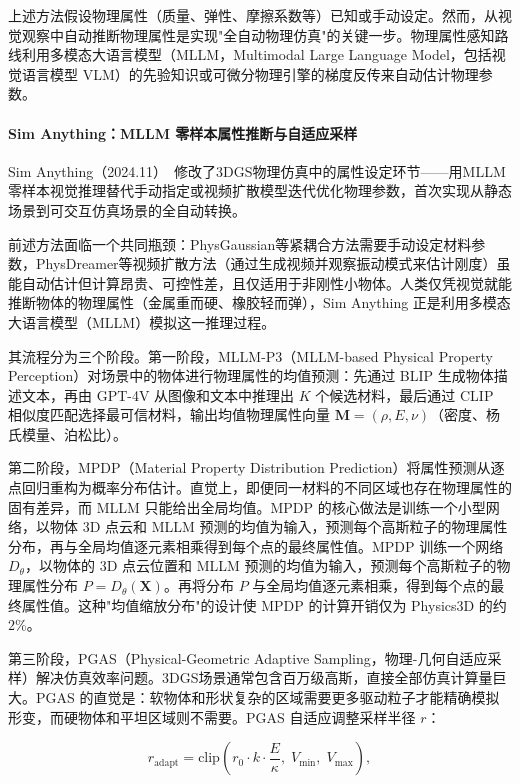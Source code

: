 上述方法假设物理属性（质量、弹性、摩擦系数等）已知或手动设定。然而，从视觉观察中自动推断物理属性是实现"全自动物理仿真"的关键一步。物理属性感知路线利用多模态大语言模型（MLLM，Multimodal Large Language Model，包括视觉语言模型 VLM）的先验知识或可微分物理引擎的梯度反传来自动估计物理参数。

\paragraph{Sim Anything：MLLM 零样本属性推断与自适应采样}

Sim Anything（2024.11）~\cite{2411_12789}修改了3DGS物理仿真中的属性设定环节——用MLLM零样本视觉推理替代手动指定或视频扩散模型迭代优化物理参数，首次实现从静态场景到可交互仿真场景的全自动转换。

前述方法面临一个共同瓶颈：PhysGaussian等紧耦合方法需要手动设定材料参数，PhysDreamer等视频扩散方法（通过生成视频并观察振动模式来估计刚度）虽能自动估计但计算昂贵、可控性差，且仅适用于非刚性小物体。人类仅凭视觉就能推断物体的物理属性（金属重而硬、橡胶轻而弹），Sim Anything 正是利用多模态大语言模型（MLLM）模拟这一推理过程。

其流程分为三个阶段。第一阶段，MLLM-P3（MLLM-based Physical Property Perception）对场景中的物体进行物理属性的均值预测：先通过 BLIP 生成物体描述文本，再由 GPT-4V 从图像和文本中推理出 $K$ 个候选材料，最后通过 CLIP 相似度匹配选择最可信材料，输出均值物理属性向量 $\mathbf{M} = (\rho, E, \nu)$（密度、杨氏模量、泊松比）。

第二阶段，MPDP（Material Property Distribution Prediction）将属性预测从逐点回归重构为概率分布估计。直觉上，即便同一材料的不同区域也存在物理属性的固有差异，而 MLLM 只能给出全局均值。MPDP 的核心做法是训练一个小型网络，以物体 3D 点云和 MLLM 预测的均值为输入，预测每个高斯粒子的物理属性分布，再与全局均值逐元素相乘得到每个点的最终属性值。MPDP 训练一个网络 $D_\theta$，以物体的 3D 点云位置和 MLLM 预测的均值为输入，预测每个高斯粒子的物理属性分布 $P = D_\theta(\mathbf{X})$。再将分布 $P$ 与全局均值逐元素相乘，得到每个点的最终属性值。这种"均值缩放分布"的设计使 MPDP 的计算开销仅为 Physics3D 的约 $2\%$。

第三阶段，PGAS（Physical-Geometric Adaptive Sampling，物理-几何自适应采样）解决仿真效率问题。3DGS场景通常包含百万级高斯，直接全部仿真计算量巨大。PGAS 的直觉是：软物体和形状复杂的区域需要更多驱动粒子才能精确模拟形变，而硬物体和平坦区域则不需要。PGAS 自适应调整采样半径 $r$：

\begin{equation}
r_{\text{adapt}} = \text{clip}\!\left(r_0 \cdot k \cdot \frac{E}{\kappa},\; V_{\min},\; V_{\max}\right),
\end{equation}

